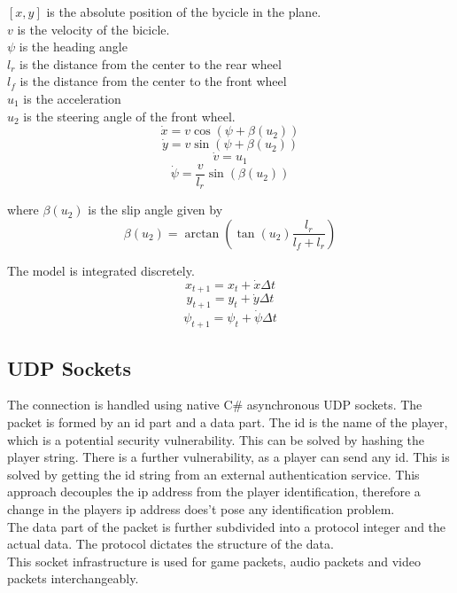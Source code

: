 \documentclass{article}
\begin{document}
\smallskip

\( [x, y] \) is the absolute position of the bycicle in the plane. \\
\( v \) is the velocity of the bicicle. \\
\( \psi \) is the heading angle \\
\( l_r \) is the distance from the center to the rear wheel \\
\( l_f \) is the distance from the center to the front wheel \\
\( u_1 \) is the acceleration \\
\( u_2 \) is the steering angle of the front wheel. \\


\begin{equation}\dot{x} = v \cos(\psi + \beta (u_2)) \end{equation}
\begin{equation}\dot{y} = v \sin(\psi + \beta (u_2)) \end{equation}
\begin{equation}\dot{v} = u_1 \end{equation}
\begin{equation}\dot{\psi} = \frac{v} {l_r} \sin(\beta(u_2)) \end{equation}

\smallskip

where \( \beta(u_2) \) is the slip angle given by
\begin{equation} \beta(u_2) = \arctan (\tan(u_2) \frac{l_r} { l_f + l_r })  \end{equation}

\bigskip

The model is integrated discretely.
\begin{equation} x_{t+1} = x_t + \dot{x}\Delta t \end{equation}
\begin{equation} y_{t+1} = y_t + \dot{y}\Delta t \end{equation}
\begin{equation} {\psi}_{t+1} = {\psi}_t + \dot{\psi}\Delta t\end{equation}

\subsection{UDP Sockets}
The connection is handled using native C\# asynchronous UDP sockets. The packet is formed by an id part and a data part. The id is the name of the player, which is a potential security vulnerability. This can be solved by hashing the player string. There is a further vulnerability, as a player can send any id. This is solved by getting the id string from an external authentication service. This approach decouples the ip address from the player identification, therefore a change in the players ip address does't pose any identification problem. \\
The data part of the packet is further subdivided into a protocol integer and the actual data. The protocol dictates the structure of the data. \\ 
This socket infrastructure is used for game packets, audio packets and video packets interchangeably.
\end{document}

